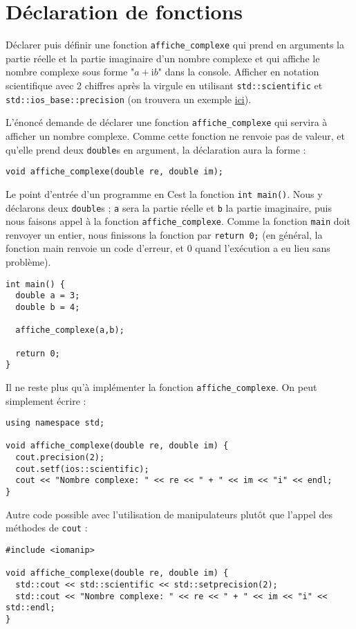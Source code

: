 \documentclass{book}
\newcommand{\inline}[1]{\texttt{#1}}
\newcommand{\cpp}{\mbox{C\vspace{.5em}\protect\raisebox{.2ex}{\footnotesize++~}}}
\begin{document}

\section{Déclaration de fonctions}

Déclarer puis définir une fonction \inline{affiche_complexe} qui prend en arguments la partie réelle et la partie imaginaire d'un nombre complexe et qui affiche le nombre complexe sous forme "$a+\mathrm{i}b$" dans la console. Afficher en notation scientifique avec 2 chiffres après la virgule en utilisant \inline{std::scientific} et \inline{std::ios_base::precision} (on trouvera un exemple \href{https://cplusplus.com/reference/ios/ios_base/precision/}{ici}).

\begin{correction}
L'énoncé demande de déclarer une fonction \inline{affiche_complexe} qui servira à afficher un nombre complexe. Comme cette fonction ne renvoie pas de valeur, et qu'elle prend deux \inline{double}s en argument, la déclaration aura la forme :
\begin{verbatim}
void affiche_complexe(double re, double im);
\end{verbatim}

Le point d'entrée d'un programme en \cpp est la fonction \inline{int main()}. Nous y déclarons deux \inline{double}s ; \inline{a} sera la partie réelle et \inline{b} la partie imaginaire, puis nous faisons appel à la fonction \inline{affiche_complexe}. Comme la fonction \inline{main} doit renvoyer un entier, nous finissons la fonction par \inline{return 0;} (en général, la fonction main renvoie un code d'erreur, et 0 quand l'exécution a eu lieu sans problème).

\begin{verbatim}
int main() {
  double a = 3;
  double b = 4;

  affiche_complexe(a,b);

  return 0;
}
\end{verbatim}

Il ne reste plus qu'à implémenter la fonction \inline{affiche_complexe}. On peut simplement écrire :
\begin{verbatim}
using namespace std;

void affiche_complexe(double re, double im) {
  cout.precision(2);
  cout.setf(ios::scientific);
  cout << "Nombre complexe: " << re << " + " << im << "i" << endl;
}
\end{verbatim}

Autre code possible avec l'utilisation de manipulateurs plutôt que l'appel des méthodes de \texttt{cout} :
\begin{verbatim}
#include <iomanip>

void affiche_complexe(double re, double im) {
  std::cout << std::scientific << std::setprecision(2);
  std::cout << "Nombre complexe: " << re << " + " << im << "i" << std::endl;
}
\end{verbatim}

\end{correction}
\end{document}
